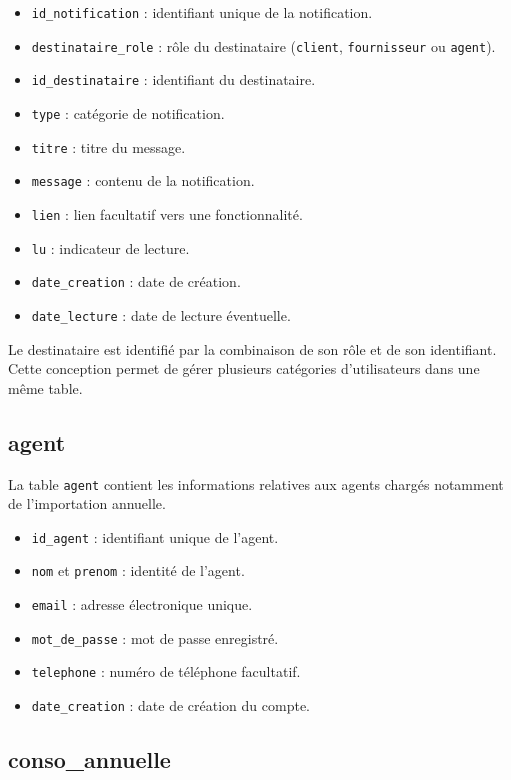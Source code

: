 \begin{itemize}[leftmargin=*]
    \item \texttt{id\_notification} : identifiant unique de la notification.
    \item \texttt{destinataire\_role} : rôle du destinataire (\texttt{client}, \texttt{fournisseur} ou \texttt{agent}).
    \item \texttt{id\_destinataire} : identifiant du destinataire.
    \item \texttt{type} : catégorie de notification.
    \item \texttt{titre} : titre du message.
    \item \texttt{message} : contenu de la notification.
    \item \texttt{lien} : lien facultatif vers une fonctionnalité.
    \item \texttt{lu} : indicateur de lecture.
    \item \texttt{date\_creation} : date de création.
    \item \texttt{date\_lecture} : date de lecture éventuelle.
\end{itemize}

Le destinataire est identifié par la combinaison de son rôle et de son identifiant. Cette conception permet de gérer plusieurs catégories d'utilisateurs dans une même table.

\subsection{agent}

La table \texttt{agent} contient les informations relatives aux agents chargés notamment de l'importation annuelle.

\begin{itemize}[leftmargin=*]
    \item \texttt{id\_agent} : identifiant unique de l'agent.
    \item \texttt{nom} et \texttt{prenom} : identité de l'agent.
    \item \texttt{email} : adresse électronique unique.
    \item \texttt{mot\_de\_passe} : mot de passe enregistré.
    \item \texttt{telephone} : numéro de téléphone facultatif.
    \item \texttt{date\_creation} : date de création du compte.
\end{itemize}

\subsection{conso\_annuelle}

